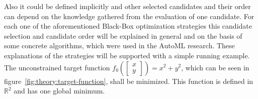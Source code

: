 Also it could be defined implicitly and other selected candidates and their order can depend on the knowledge gathered from the evaluation of one candidate.\newline
For each one of the aforementioned Black-Box optimization strategies this candidate selection and candidate order will be explained in general and on the basis of some concrete algorithms, which were used in the AutoML research.
These explanations of the strategies will be supported with a simple running example.
The unconstrained target function $f_0 \left( \begin{bmatrix}x\\y \end{bmatrix} \right) = x^2 + y^2$, which can be seen in figure~\ref{fig:theory:target-function}, shall be minimized.
This function is defined in $\mathbb{R}^2$ and has one global minimum.
